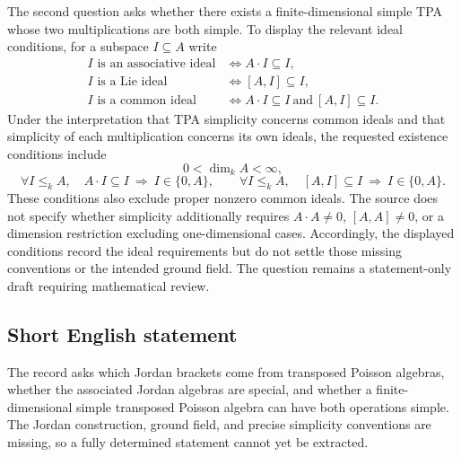 \documentclass[11pt]{article}
\begin{document}
The second question asks whether there exists a finite-dimensional simple TPA whose two multiplications are both simple. To display the relevant ideal conditions, for a subspace \(I\subseteq A\) write
\[
\begin{aligned}
I\text{ is an associative ideal}&\iff A\cdot I\subseteq I,\\
I\text{ is a Lie ideal}&\iff [A,I]\subseteq I,\\
I\text{ is a common ideal}&\iff A\cdot I\subseteq I\ \text{and}\ [A,I]\subseteq I.
\end{aligned}
\]
Under the interpretation that TPA simplicity concerns common ideals and that simplicity of each multiplication concerns its own ideals, the requested existence conditions include
\[
0<\dim_k A<\infty,
\]
\[
\forall I\le_k A,\quad
A\cdot I\subseteq I\ \Longrightarrow\ I\in\{0,A\},
\qquad
\forall I\le_k A,\quad
[A,I]\subseteq I\ \Longrightarrow\ I\in\{0,A\}.
\]
These conditions also exclude proper nonzero common ideals. The source does not specify whether simplicity additionally requires \(A\cdot A\ne0\), \([A,A]\ne0\), or a dimension restriction excluding one-dimensional cases. Accordingly, the displayed conditions record the ideal requirements but do not settle those missing conventions or the intended ground field. The question remains a statement-only draft requiring mathematical review.
\subsection{Short English statement}
The record asks which Jordan brackets come from transposed Poisson algebras, whether the associated Jordan algebras are special, and whether a finite-dimensional simple transposed Poisson algebra can have both operations simple. The Jordan construction, ground field, and precise simplicity conventions are missing, so a fully determined statement cannot yet be extracted.
\end{document}
